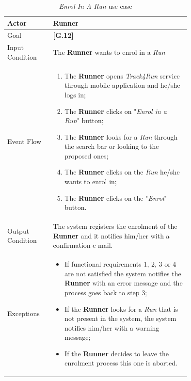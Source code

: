 \begin{center}
\begin{table}
\begin{tabular}{ | l | p{0.75\linewidth} | }
  \hline
    Actor & \textbf{Runner} \\ \hline
    Goal & \textbf{[G.12]} \\ \hline
    Input Condition & The \textbf{Runner} wants to enrol in a \textit{Run} \\ \hline
    Event Flow & \begin{minipage}[t]{0.7\textwidth}
      \begin{enumerate}
        \item The \textbf{Runner} opens \textit{Track4Run} service through mobile application and he/she logs in;
        \item The \textbf{Runner} clicks on "\textit{Enrol in a Run}" button;
        \item The \textbf{Runner} looks for a \textit{Run} through the search bar or looking to the proposed ones;
        \item The \textbf{Runner} clicks on the \textit{Run} he/she wants to enrol in;
        \item The \textbf{Runner} clicks on the "\textit{Enrol}" button.
      \end{enumerate}
    \smallskip
  \end{minipage} \\ \hline
  Output Condition & The system registers the enrolment of the \textbf{Runner} and it notifies him/her with a confirmation e-mail. \\ \hline
  Exceptions & \begin{minipage}[t]{0.7\textwidth}
    \begin{itemize}
      \smallskip
      \item If functional requirements 1, 2, 3 or 4 are not satisfied the system notifies the \textbf{Runner} with an error message and the process goes back to step 3;
      \item If the \textbf{Runner} looks for a \textit{Run} that is not present in the system, the system notifies him/her with a warning message;
      \item If the \textbf{Runner} decides to leave the enrolment process this one is aborted.
    \end{itemize}
    \smallskip
  \end{minipage}  \\ \hline
\end{tabular}
\caption{\textit{Enrol In A Run} use case}
\label{table:enrolRunTable}
\end{table}
\end{center}

